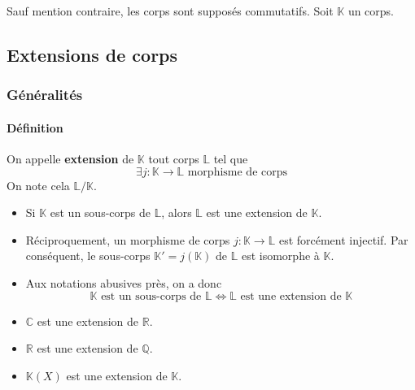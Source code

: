 



  Sauf mention contraire, les corps sont supposés commutatifs. Soit $\mathbb{K}$ un corps.

  \subsection{Extensions de corps}

  \subsubsection{Généralités}

  \paragraph{Définition}


  \begin{definition}
    On appelle \textbf{extension} de $\mathbb{K}$ tout corps $\mathbb{L}$ tel que
    \[ \exists j : \mathbb{K} \rightarrow \mathbb{L} \text{ morphisme de corps} \]
    On note cela $\mathbb{L}/\mathbb{K}$.
  \end{definition}

  \begin{remark}
    \begin{itemize}
      \item Si $\mathbb{K}$ est un sous-corps de $\mathbb{L}$, alors $\mathbb{L}$ est une extension de $\mathbb{K}$.
      \item Réciproquement, un morphisme de corps $j : \mathbb{K} \rightarrow \mathbb{L}$ est forcément injectif. Par conséquent, le sous-corps $\mathbb{K}' = j(\mathbb{K})$ de $\mathbb{L}$ est isomorphe à $\mathbb{K}$.
      \item Aux notations abusives près, on a donc
      \[ \mathbb{K} \text{ est un sous-corps de } \mathbb{L} \iff \mathbb{L} \text{ est une extension de } \mathbb{K} \]
    \end{itemize}
  \end{remark}

  \begin{example}
    \begin{itemize}
      \item $\mathbb{C}$ est une extension de $\mathbb{R}$.
      \item $\mathbb{R}$ est une extension de $\mathbb{Q}$.
      \item $\mathbb{K}(X)$ est une extension de $\mathbb{K}$.
    \end{itemize}
  \end{example}

